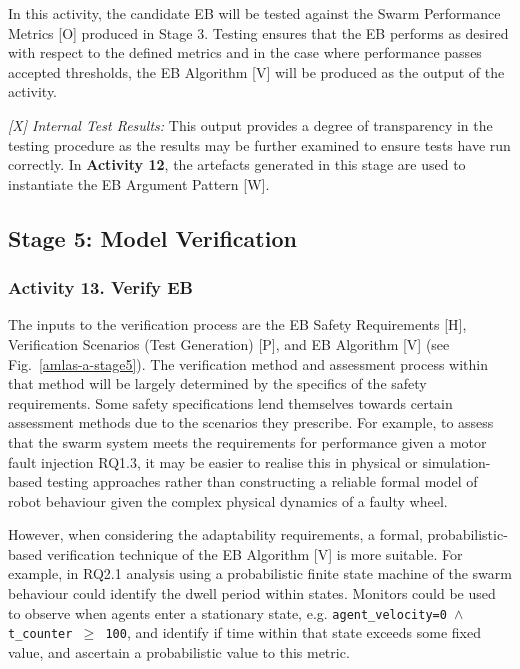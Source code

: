 \documentclass[runningheads]{llncs}
\begin{document}
In this activity, the candidate EB will be tested against the Swarm Performance Metrics [O] produced in Stage 3. Testing ensures that the EB performs as desired with respect to the defined metrics and in the case where performance passes accepted thresholds, the EB Algorithm [V] will be produced as the output of the activity. 

\emph{[X] Internal Test Results:} This output provides a degree of transparency in the testing procedure as the results may be further examined to ensure tests have run correctly. 
In \textbf{Activity 12}, the artefacts generated in this stage are used to instantiate the EB Argument Pattern [W].

\subsection{Stage 5: Model Verification} \label{framework-stage5}
\subsubsection*{Activity 13. Verify EB}
The inputs to the verification process are the EB Safety Requirements [H], Verification Scenarios (Test Generation) [P], and EB Algorithm [V] (see Fig.~\ref{amlas-a-stage5}). 
%
The verification method and assessment process within that method will be largely determined by the specifics of the safety requirements. Some safety specifications lend themselves towards certain assessment methods due to the scenarios they prescribe.
%
For example, to assess that the swarm system meets the requirements for performance given a motor fault injection RQ1.3, it may be easier to realise this in physical or simulation-based testing approaches rather than constructing a reliable formal model of robot behaviour given the complex physical dynamics of a faulty wheel.

%
However, when considering the adaptability requirements, a formal, probabilistic-based verification technique of the EB Algorithm [V] is more suitable. For example, in RQ2.1 analysis using a probabilistic finite state machine of the swarm behaviour could identify the dwell period within states. Monitors could be used to observe when agents enter a stationary state, e.g. \texttt{agent\_velocity=0 $\land $  t\_counter  $\ge$ 100}, and identify if time within that state exceeds some fixed value, and ascertain a probabilistic value to this metric.
\end{document}
